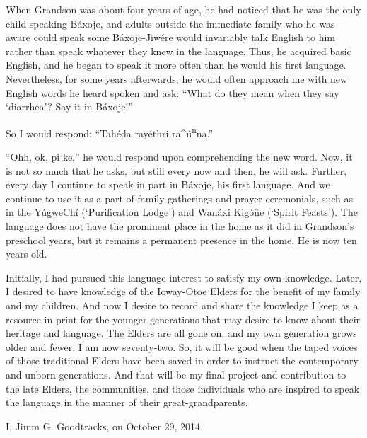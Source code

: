 \documentclass[output=paper]{LSP/langsci}
\begin{document}
When Grandson was about four years of age, he had noticed that he was the only child speaking B\'axoje, and adults outside the immediate family who he was aware could speak some B\'axoje-Jiw\'ere would invariably talk English to him rather than speak whatever they knew in the language. Thus, he acquired basic English, and he began to speak it more often than he would his first language. Nevertheless, for some years afterwards, he would often approach me with new English words he heard spoken and ask: ``What do they mean when they say `diarrhea'? Say it in B\'axoje!''

So I would respond: ``Tah\'eda ray\'ethri ra\^{ }\'u\textsuperscript{n}na.''
	
``Ohh, ok, p\'i ke,'' he would respond upon comprehending the new word. Now, it is not so much that he asks, but still every now and then, he will ask. Further, every day I continue to speak in part in B\'axoje, his first language. And we continue to use it as a part of family gatherings and prayer ceremonials, such as in the Y\'ugweCh\'i (`Purification Lodge') and Wan\'axi Kig\'o\~ne (`Spirit Feasts'). The language does not have the prominent place in the home as it did in Grandson's preschool years, but it remains a permanent presence in the home. He is now ten years old.

Initially, I had pursued this language interest to satisfy my own knowledge. Later, I desired to have knowledge of the Ioway-Otoe Elders for the benefit of my family and my children. And now I desire to record and share the knowledge I keep as a resource in print for the younger generations that may desire to know about their heritage and language. The Elders are all gone on, and my own generation grows older and fewer. I am now seventy-two. So, it will be good when the taped voices of those traditional Elders have been saved in order to instruct the contemporary and unborn generations. And that will be my final project and contribution to the late Elders, the communities, and those individuals who are inspired to speak the language in the manner of their great-grandparents.

I, Jimm G. Goodtracks, on October 29, 2014.
\end{document}
